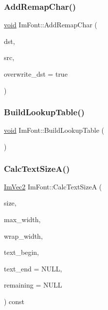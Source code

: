 \mbox{\label{structImFont_aba8cd20f14ba47175d45d3f2063aa329}} 
\subsubsection{\texorpdfstring{Add\+Remap\+Char()}{AddRemapChar()}}
{\footnotesize\ttfamily \hyperlink{imgui__impl__opengl3__loader_8h_ac668e7cffd9e2e9cfee428b9b2f34fa7}{void} Im\+Font\+::\+Add\+Remap\+Char (\begin{DoxyParamCaption}\item[{Im\+Wchar}]{dst,  }\item[{Im\+Wchar}]{src,  }\item[{bool}]{overwrite\+\_\+dst = {\ttfamily true} }\end{DoxyParamCaption})}

\mbox{\label{structImFont_a04b3a1437bd0032722bbbd3613941162}} 
\subsubsection{\texorpdfstring{Build\+Lookup\+Table()}{BuildLookupTable()}}
{\footnotesize\ttfamily \hyperlink{imgui__impl__opengl3__loader_8h_ac668e7cffd9e2e9cfee428b9b2f34fa7}{void} Im\+Font\+::\+Build\+Lookup\+Table (\begin{DoxyParamCaption}{ }\end{DoxyParamCaption})}

\mbox{\label{structImFont_ad67f64fd206ad197f4b93b1a1ae27cfe}} 
\subsubsection{\texorpdfstring{Calc\+Text\+Size\+A()}{CalcTextSizeA()}}
{\footnotesize\ttfamily \hyperlink{structImVec2}{Im\+Vec2} Im\+Font\+::\+Calc\+Text\+SizeA (\begin{DoxyParamCaption}\item[{float}]{size,  }\item[{float}]{max\+\_\+width,  }\item[{float}]{wrap\+\_\+width,  }\item[{const char $\ast$}]{text\+\_\+begin,  }\item[{const char $\ast$}]{text\+\_\+end = {\ttfamily NULL},  }\item[{const char $\ast$$\ast$}]{remaining = {\ttfamily NULL} }\end{DoxyParamCaption}) const}

